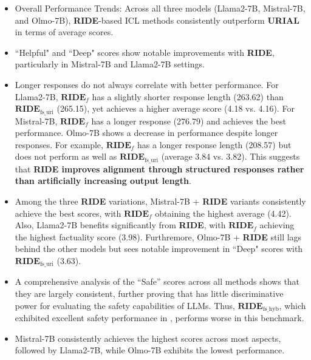 \begin{itemize}
    \item Overall Performance Trends: Across all three models (Llama2-7B, Mistral-7B, and Olmo-7B), \textbf{RIDE}-based ICL methods consistently outperform \textbf{URIAL} in terms of average scores.

    \item ``Helpful" and ``Deep" scores show notable improvements with \textbf{RIDE}, particularly in Mistral-7B and Llama2-7B settings.

    \item Longer responses do not always correlate with better performance. For Llama2-7B, $\textbf{RIDE}_{f}$ has a slightly shorter response length (263.62) than $\textbf{RIDE}_{\text{fs\_uri}}$ (265.15), yet achieves a higher average score (4.18 vs. 4.16). For Mistral-7B, $\textbf{RIDE}_{f}$ has a longer response (276.79) and achieves the best performance. Olmo-7B shows a decrease in performance despite longer responses. For example, $\textbf{RIDE}_{f}$ has a longer response length (208.57) but does not perform as well as $\textbf{RIDE}_{\text{fs\_uri}}$ (average 3.84 vs. 3.82). This suggests that \textbf{RIDE improves alignment through structured responses rather than artificially increasing output length}.

    \item Among the three \textbf{RIDE} variations, Mistral-7B + \textbf{RIDE} variants consistently achieve the best scores, with $\textbf{RIDE}_{f}$ obtaining the highest average (4.42). Also, Llama2-7B benefits significantly from \textbf{RIDE}, with $\textbf{RIDE}_{f}$ achieving the highest factuality score (3.98). Furthremore, Olmo-7B + \textbf{RIDE} still lags behind the other models but sees notable improvement in ``Deep" scores with $\textbf{RIDE}_{\text{fs\_uri}}$ (3.63).

    \item A comprehensive analysis of the ``Safe'' scores across all methods shows that they are largely consistent, further proving that \alpaca{} has little discriminative power for evaluating the safety capabilities of LLMs. Thus, $\textbf{RIDE}_{\text{fs\_hyb}}$, which exhibited excellent safety performance in \dataname{}, performs worse in this benchmark.

    \item Mistral-7B consistently achieves the highest scores across most aspects, followed by Llama2-7B, while Olmo-7B exhibits the lowest performance.

\end{itemize}
